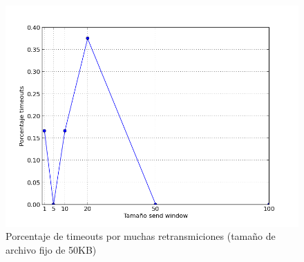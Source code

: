 \begin{figure}[H]
\begin{center}
\includegraphics[width=\textwidth,keepaspectratio]{porcentajetimeouts50.png}
\end{center}
\caption{Porcentaje de timeouts por muchas retransmiciones (tamaño de archivo fijo de 50KB)} \label{figura5}
\end{figure}
